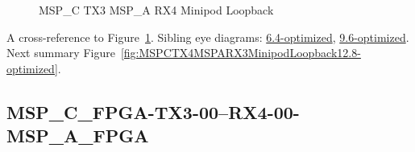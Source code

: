 \begin{figure}[h]
\begin{subfigure}{0.33\textwidth}
\hyperref[sec:MSPCFPGATX306RX406MSPAFPGA12.8-optimized]{}
\end{subfigure}\hspace*{\fill}
\begin{subfigure}{0.33\textwidth}
\hyperref[sec:MSPCFPGATX307RX407MSPAFPGA12.8-optimized]{}
\end{subfigure}\hspace*{\fill}
\begin{subfigure}{0.33\textwidth}
\hyperref[sec:MSPCFPGATX308RX408MSPAFPGA12.8-optimized]{}
\end{subfigure}

\begin{subfigure}{0.33\textwidth}
\hyperref[sec:MSPCFPGATX309RX409MSPAFPGA12.8-optimized]{}
\end{subfigure}\hspace*{\fill}
\begin{subfigure}{0.33\textwidth}
\hyperref[sec:MSPCFPGATX310RX410MSPAFPGA12.8-optimized]{}
\end{subfigure}\hspace*{\fill}
\begin{subfigure}{0.33\textwidth}
\hyperref[sec:MSPCFPGATX311RX411MSPAFPGA12.8-optimized]{}
\end{subfigure}

\caption{MSP\_C TX3 MSP\_A RX4 Minipod Loopback} \label{fig:MSPCTX3MSPARX4MinipodLoopback12.8-optimized}
\end{figure}

A cross-reference to Figure~\ref{fig:MSPCTX3MSPARX4MinipodLoopback12.8-optimized}.
Sibling eye diagrams: \hyperref[sec:MSPCTX3MSPARX4MinipodLoopback6.4-optimized]{6.4-optimized}, \hyperref[sec:MSPCTX3MSPARX4MinipodLoopback9.6-optimized]{9.6-optimized}. \\
Next summary Figure~\ref{fig:MSPCTX4MSPARX3MinipodLoopback12.8-optimized}.
\clearpage
% 
\subsection{MSP\_C\_FPGA-TX3-00--RX4-00-MSP\_A\_FPGA}\label{sec:MSPCFPGATX300RX400MSPAFPGA12.8-optimized}

